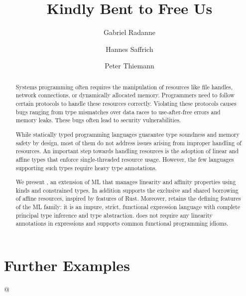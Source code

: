 \documentclass[acmsmall,review,anonymous]{acmart}
\author{Gabriel Radanne}
\affiliation{
  \institution{University of Freiburg}
  \country{Germany}
}
\author{Hannes Saffrich}
\affiliation{
  \institution{University of Freiburg}
  \country{Germany}
}
\author{Peter Thiemann}
\affiliation{
  \institution{University of Freiburg}
  \country{Germany}
}
\begin{document}
\title{Kindly Bent to Free Us}
\begin{abstract}
  Systems programming often requires the manipulation of resources like
  file handles, network connections, or dynamically allocated
  memory. Programmers need to follow certain protocols to handle
  these resources correctly. Violating these protocols causes bugs
  ranging from type mismatches over data races to use-after-free
  errors and memory leaks. These bugs often lead to security  vulnerabilities.

  While statically typed programming languages guarantee type soundness and memory
  safety by design, most of them do not address issues arising
  from improper handling of resources.
  An important step towards handling resources is the adoption of 
  linear and affine types that enforce single-threaded resource usage.
  However, the few languages supporting such types require heavy type
  annotations. 

  We present \lang, an extension of ML that
  manages linearity and affinity properties using kinds and
  constrained types. In addition
  \lang{} supports the exclusive and shared borrowing of affine
  resources, inspired by features of Rust.
  Moreover, \lang{} retains the defining features of the ML family:
  it is an impure, strict, functional expression language with complete principal type
  inference and type abstraction.
  \lang{} does not require any linearity annotations in
  expressions and supports common functional programming idioms.
\end{abstract}


\maketitle















\clearpage
\appendix

\section{Further Examples}
\label{sec:extra-example}
\lstMakeShortInline[keepspaces,basicstyle=\small\ttfamily]@


\lstDeleteShortInline@


\clearpage

\clearpage


\end{document}
